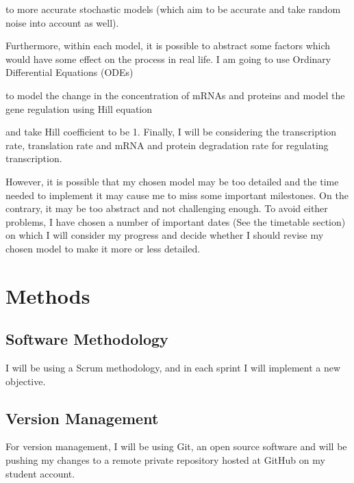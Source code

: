 \documentclass{article}
\begin{document}
	to more accurate stochastic models (which aim to be accurate and take random noise into account as well).
	
	Furthermore, within each model, it is possible to abstract some factors which would have some effect on the process in real life. I am going to use Ordinary Differential Equations (ODEs) 
	
	to model the change in the concentration of mRNAs and proteins and model the gene regulation using Hill equation
	
	and take Hill coefficient to be 1. Finally, I will be considering the transcription rate, translation rate and mRNA and protein degradation rate for regulating transcription.
	
	\par However, it is possible that my chosen model may be too detailed and the time needed to implement it may cause me to miss some important milestones. On the contrary, it may be too abstract and not challenging enough. To avoid either problems, I have chosen a number of important dates (See the timetable section) on which I will consider my progress and decide whether I should revise my chosen model to make it more or less detailed.
	
	
	\section{Methods}
	
	\subsection{Software Methodology}
	
	\par I will be using a Scrum methodology, and in each sprint I will implement a new objective.
	
	
	\subsection{Version Management}
	\par For version management, I will be using Git, an open source software and will be pushing my changes to a remote private repository hosted at GitHub on my student account.
	
\end{document}
